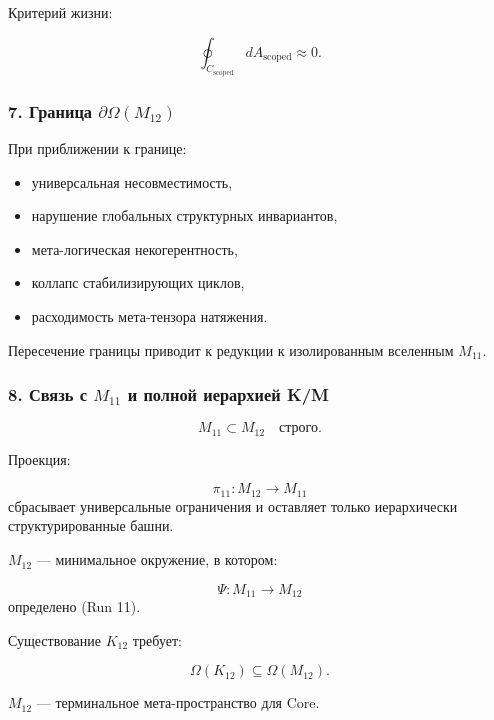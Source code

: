 Критерий жизни:

\[
\oint_{C_{\mathrm{scoped}}} dA_{\mathrm{scoped}} \approx 0.
\]

\subsubsection*{7. Граница $\partial\Omega(M_{12})$}

При приближении к границе:

\begin{itemize}
    \item универсальная несовместимость,
    \item нарушение глобальных структурных инвариантов,
    \item мета-логическая некогерентность,
    \item коллапс стабилизирующих циклов,
    \item расходимость мета-тензора натяжения.
\end{itemize}

Пересечение границы приводит к редукции к изолированным вселенным $M_{11}$.

\subsubsection*{8. Связь с $M_{11}$ и полной иерархией K/M}

\[
M_{11} \subset M_{12}
\quad\text{строго}.
\]

Проекция:

\[
\pi_{11}: M_{12} \to M_{11}
\]
сбрасывает универсальные ограничения и оставляет только иерархически структурированные башни.

$M_{12}$ — минимальное окружение, в котором:

\[
\Psi: M_{11} \to M_{12}
\]
определено (Run 11).

Существование $K_{12}$ требует:

\[
\Omega(K_{12}) \subseteq \Omega(M_{12}).
\]

$M_{12}$ — терминальное мета-пространство для Core.
